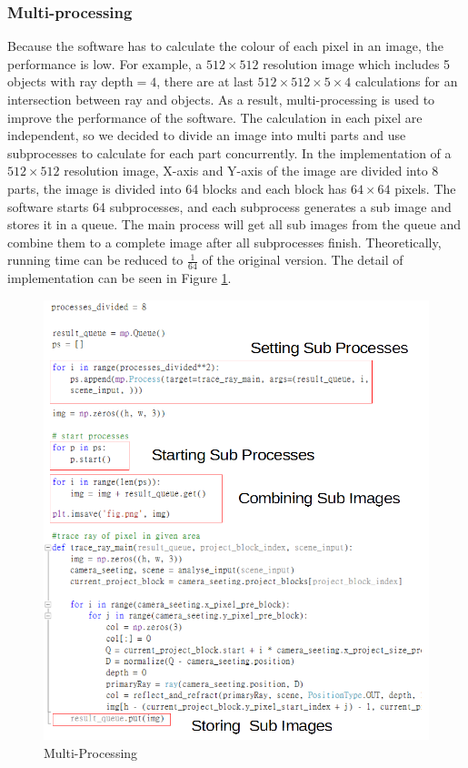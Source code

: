 \documentclass[a4paper, 12pt]{article}
\begin{document}
\subsubsection{Multi-processing}
Because the software has to calculate the colour of each pixel in an image, the performance is low. For example, a $512\times512$ resolution image which includes 5 objects with ray depth$=4$, there are at last  $512\times512\times5\times4$ calculations for an intersection between ray and objects. As a result, multi-processing is used to improve the performance of the software. The calculation in each pixel are independent, so we decided to divide an image into multi parts and use subprocesses to calculate for each part concurrently. In the implementation of a $512\times512$ resolution image, X-axis and Y-axis of the image are divided into 8 parts, the image is divided into 64 blocks and each block has $64\times64$ pixels. The software starts 64 subprocesses, and each subprocess generates a sub image and stores it in a queue. The main process will get all sub images from the queue and combine them to a complete image after all subprocesses finish. Theoretically, running time can be reduced to $\frac{1}{64}$ of the original version. The detail of implementation can be seen in Figure \ref{fig:Multi-Processing}.

\begin{figure}[H]
\centering
\includegraphics[width=0.8\linewidth]{Multi-processing.png}
\caption{Multi-Processing}
\label{fig:Multi-Processing}
\end{figure} 
\end{document}
